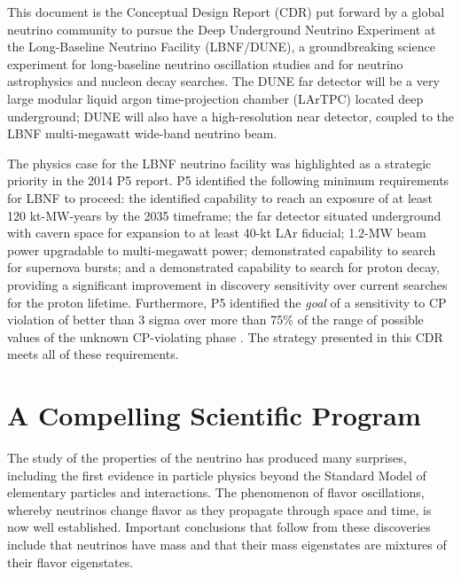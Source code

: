 This document is %
the Conceptual Design Report (CDR) put forward by a global neutrino community to pursue 
the Deep Underground Neutrino Experiment at the Long-Baseline Neutrino Facility (LBNF/DUNE),
a groundbreaking science experiment for long-baseline neutrino oscillation studies and for neutrino astrophysics and nucleon decay searches. The DUNE far detector will be a very large modular liquid argon time-projection chamber (LArTPC) located deep underground; DUNE will also have a high-resolution near detector, coupled to the LBNF multi-megawatt  %
wide-band neutrino beam. 

The physics case for the LBNF neutrino facility was highlighted as a strategic priority in the 2014 P5 report.
P5 identified the following minimum requirements for LBNF to proceed: 
the identified capability to reach an exposure of at least 120 kt-MW-years by the 2035 timeframe;
the far detector situated underground with cavern space for expansion to at least 40-kt LAr fiducial;
1.2-MW beam power upgradable to multi-megawatt power;
demonstrated capability to search for supernova bursts; and
a demonstrated capability to search for proton decay, 
providing a significant improvement in discovery sensitivity over current searches for the proton lifetime.
Furthermore, P5 identified  the {\it goal} of a sensitivity to CP violation of better than 3 sigma over more than 75\% 
of the range of possible values of the unknown CP-violating phase \deltacp.
The strategy presented in this CDR meets all of these requirements.



\section{A Compelling Scientific Program}

The study of the properties of the neutrino has produced %
many surprises, including the first evidence in particle physics beyond the Standard Model of elementary particles and interactions.   The phenomenon of flavor oscillations, whereby neutrinos change flavor as they propagate through space and time, is now well established. Important conclusions that follow from these discoveries include that neutrinos have mass and that their %
mass eigenstates are mixtures of their %
flavor eigenstates.

